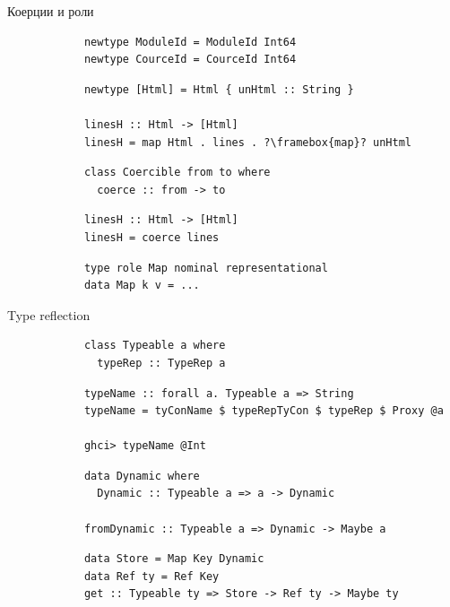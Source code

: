     \begin{frame}[fragile]{Коерции и роли}
        \pause
        \begin{verbatim}
            newtype ModuleId = ModuleId Int64
            newtype CourceId = CourceId Int64
        \end{verbatim}
        \pause\vspace{1em}
        \begin{verbatim}
            newtype [Html] = Html { unHtml :: String }

            linesH :: Html -> [Html]
            linesH = map Html . lines . ?\framebox{map}? unHtml
        \end{verbatim}
        \pause\vspace{1em}
        \begin{verbatim}
            class Coercible from to where
              coerce :: from -> to
        \end{verbatim}
        \pause\vspace{1em}
        \begin{verbatim}
            linesH :: Html -> [Html]
            linesH = coerce lines
        \end{verbatim}
        \pause\vspace{1em}
        \begin{verbatim}
            type role Map nominal representational
            data Map k v = ...
        \end{verbatim}
    \end{frame}

    \begin{frame}[fragile]{Type reflection}
        \pause
        \begin{verbatim}
            class Typeable a where
              typeRep :: TypeRep a
        \end{verbatim}
        \pause\vspace{1em}
        \begin{verbatim}
            typeName :: forall a. Typeable a => String
            typeName = tyConName $ typeRepTyCon $ typeRep $ Proxy @a

            ghci> typeName @Int
        \end{verbatim}
        \pause\vspace{1em}
        \begin{verbatim}
            data Dynamic where
              Dynamic :: Typeable a => a -> Dynamic

            fromDynamic :: Typeable a => Dynamic -> Maybe a
        \end{verbatim}
        \pause\vspace{1em}
        \begin{verbatim}
            data Store = Map Key Dynamic
            data Ref ty = Ref Key
            get :: Typeable ty => Store -> Ref ty -> Maybe ty
        \end{verbatim}
    \end{frame}


